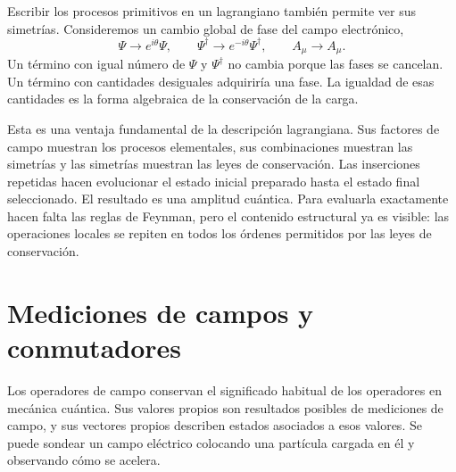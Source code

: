 Escribir los procesos primitivos en un lagrangiano también permite ver sus simetrías. Consideremos un cambio global de fase del campo electrónico,
\begin{equation}
\Psi\longrightarrow e^{i\theta}\Psi,
\qquad
\Psi^\dagger\longrightarrow e^{-i\theta}\Psi^\dagger,
\qquad
A_\mu\longrightarrow A_\mu.
\end{equation}
Un término con igual número de \(\Psi\) y \(\Psi^\dagger\) no cambia porque las fases se cancelan. Un término con cantidades desiguales adquiriría una fase. La igualdad de esas cantidades es la forma algebraica de la conservación de la carga.

Esta es una ventaja fundamental de la descripción lagrangiana. Sus factores de campo muestran los procesos elementales, sus combinaciones muestran las simetrías y las simetrías muestran las leyes de conservación. Las inserciones repetidas hacen evolucionar el estado inicial preparado hasta el estado final seleccionado. El resultado es una amplitud cuántica. Para evaluarla exactamente hacen falta las reglas de Feynman, pero el contenido estructural ya es visible: las operaciones locales se repiten en todos los órdenes permitidos por las leyes de conservación.

\section{Mediciones de campos y conmutadores}

Los operadores de campo conservan el significado habitual de los operadores en mecánica cuántica. Sus valores propios son resultados posibles de mediciones de campo, y sus vectores propios describen estados asociados a esos valores. Se puede sondear un campo eléctrico colocando una partícula cargada en él y observando cómo se acelera.

\begin{classroomqa}
\end{classroomqa}

